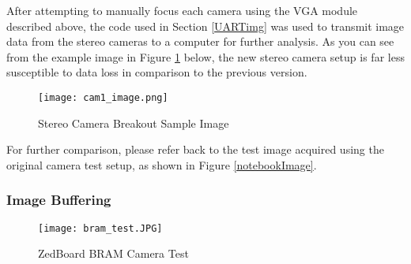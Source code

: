 \par
After attempting to manually focus each camera using the VGA module described above, the code used in Section \ref{UARTimg} was used to transmit image data from the stereo cameras to a computer for further analysis. As you can see from the example image in Figure \ref{newBoardImage} below, the new stereo camera setup is far less susceptible to data loss in comparison to the previous version. 
\begin{figure}[H] 
	\centering
	\texttt{[image: cam1\_image.png]}
	\caption{Stereo Camera Breakout Sample Image}
	\label{newBoardImage}
\end{figure}
\par
For further comparison, please refer back to the test image acquired using the original camera test setup, as shown in Figure \ref{notebookImage}.
\subsubsection{Image Buffering}
\begin{figure}[H] 
	\centering
	\texttt{[image: bram\_test.JPG]}
	\caption{ZedBoard BRAM Camera Test}
	\label{bramCamTest}
\end{figure}